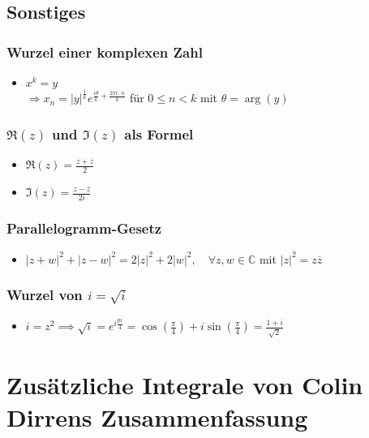 \documentclass[a3paper, 11pt, landscape]{scrartcl}
\begin{document}
\begin{multicols*}{3}
        \subsection{Sonstiges}
        \subsubsection{Wurzel einer komplexen Zahl}
        \begin{itemize}
            \item $x^k = y$ \\
            $\Rightarrow x_n = | y | ^{\frac{1}{k}} e^{\frac{i\theta}{k}+\frac{2\pi i \cdot n}{k}}$ für $0 \leq n < k$ mit $\theta = \arg(y)$
        \end{itemize}
        \subsubsection{$\Re (z)$ und $\Im (z)$ als Formel}
        \begin{itemize}
            \item $\Re (z) = \frac{z+\overline{z}}{2}$ 
            \item $\Im (z) = \frac{z-\overline{z}}{2i}$
        \end{itemize}
        \subsubsection{Parallelogramm-Gesetz}
        \begin{itemize}
            \item $| z+w | ^2+ | z-w | ^2=2 | z | ^2+2 | w | ^2, \quad \forall z, w \in \mathbb{C}$ mit $|z|^2=z\overline{z}$
        \end{itemize}
		\subsubsection{Wurzel von $i=\sqrt{i}$}
		\begin{itemize}
		    \item $i=z^2\implies \sqrt{i}=e^{i\frac{pi}{4}}=\cos (\frac{\pi}{4})+i\sin(\frac{\pi}{4})=\frac{1+i}{\sqrt{2}}$
		\end{itemize}
		
		\section{Zusätzliche Integrale von Colin Dirrens Zusammenfassung}

\end{multicols*}
\end{document}
